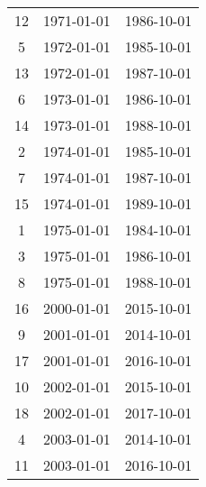 % 
\begin{tabular}{ccc}
  \hline
  \hline
12 & 1971-01-01 & 1986-10-01 \\ 
  5 & 1972-01-01 & 1985-10-01 \\ 
  13 & 1972-01-01 & 1987-10-01 \\ 
  6 & 1973-01-01 & 1986-10-01 \\ 
  14 & 1973-01-01 & 1988-10-01 \\ 
  2 & 1974-01-01 & 1985-10-01 \\ 
  7 & 1974-01-01 & 1987-10-01 \\ 
  15 & 1974-01-01 & 1989-10-01 \\ 
  1 & 1975-01-01 & 1984-10-01 \\ 
  3 & 1975-01-01 & 1986-10-01 \\ 
  8 & 1975-01-01 & 1988-10-01 \\ 
  16 & 2000-01-01 & 2015-10-01 \\ 
  9 & 2001-01-01 & 2014-10-01 \\ 
  17 & 2001-01-01 & 2016-10-01 \\ 
  10 & 2002-01-01 & 2015-10-01 \\ 
  18 & 2002-01-01 & 2017-10-01 \\ 
  4 & 2003-01-01 & 2014-10-01 \\ 
  11 & 2003-01-01 & 2016-10-01 \\ 
   \hline
\end{tabular}
